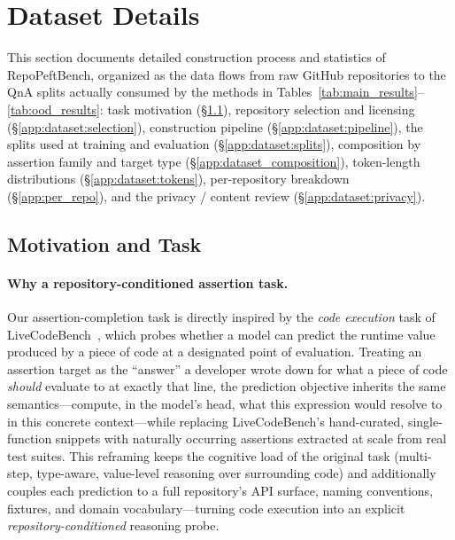 \documentclass{llmxive}
\providecommand{\repopeftbench}{RepoPeftBench\xspace}
\begin{document}
\section{Dataset Details}
\label{app:dataset}
\label{app:dataset_construction}

This section documents detailed construction process and statistics of \repopeftbench{}, organized as the data flows from raw GitHub repositories to the QnA splits actually consumed by the methods in Tables~\ref{tab:main_results}--\ref{tab:ood_results}:
task motivation (\S\ref{app:dataset:motivation}),
repository selection and licensing (\S\ref{app:dataset:selection}),
construction pipeline (\S\ref{app:dataset:pipeline}),
the splits used at training and evaluation (\S\ref{app:dataset:splits}),
composition by assertion family and target type (\S\ref{app:dataset_composition}),
token-length distributions (\S\ref{app:dataset:tokens}),
per-repository breakdown (\S\ref{app:per_repo}),
and the privacy / content review (\S\ref{app:dataset:privacy}).

\subsection{Motivation and Task}
\label{app:dataset:motivation}

\paragraph{Why a repository-conditioned assertion task.}
Our assertion-completion task is directly inspired by the \emph{code execution} task of LiveCodeBench~\cite{jain2025livecodebench}, which probes whether a model can predict the runtime value produced by a piece of code at a designated point of evaluation.
Treating an assertion target as the ``answer'' a developer wrote down for what a piece of code \emph{should} evaluate to at exactly that line, the prediction objective inherits the same semantics---compute, in the model's head, what this expression would resolve to in this concrete context---while replacing LiveCodeBench's hand-curated, single-function snippets with naturally occurring assertions extracted at scale from real test suites.
This reframing keeps the cognitive load of the original task (multi-step, type-aware, value-level reasoning over surrounding code) and additionally couples each prediction to a full repository's API surface, naming conventions, fixtures, and domain vocabulary---turning code execution into an explicit \emph{repository-conditioned} reasoning probe.
\end{document}

